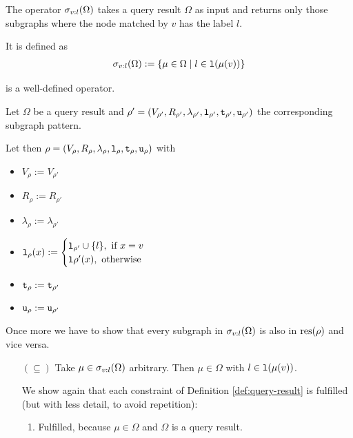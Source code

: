 \begin{definition}
\label{def:label-selection}

The  operator $\sigma_{v:l}(\Omega)$ takes a query
result $\Omega$ as input and returns only those subgraphs where the node
matched by $v$ has the label $l$.

It is defined as
\begin{align*}
  \sigma_{v:l}(\Omega) := \{ \mu \in \Omega \mid l \in \texttt{l}(\mu(v)) \}
\end{align*}

\begin{proofof}{ is a well-defined operator.}
\label{proof:label-selection-well-defined}

Let $\Omega$ be a query result and
$\rho' = (V_{\rho'}, R_{\rho'}, \lambda_{\rho'}, \texttt{l}_{\rho'}, \texttt{t}_{\rho'}, \texttt{u}_{\rho'})$
the corresponding subgraph pattern.

Let then $\rho = (V_\rho, R_\rho, \lambda_\rho, \texttt{l}_\rho, \texttt{t}_\rho, \texttt{u}_\rho)$
with
\begin{itemize}[label={}]
  \item $V_\rho := V_{\rho'}$
  \item $R_\rho := R_{\rho'}$
  \item $\lambda_\rho := \lambda_{\rho'}$
  \item $\texttt{l}_\rho(x) := \begin{cases}
                              \texttt{l}_{\rho'} \cup \{ l \}, \text{ if } x = v \\
                              \texttt{l}{\rho'}(x), \text{ otherwise}
                            \end{cases}$
  \item $\texttt{t}_\rho := \texttt{t}_{\rho'}$
  \item $\texttt{u}_\rho := \texttt{u}_{\rho'}$
\end{itemize}

Once more we have to show that every subgraph in
$\sigma_{v:l}(\Omega)$ is also in $\text{res}(\rho)$ and vice
versa.

\begin{itemize}
  \item[$(\subseteq)$]
    Take $\mu \in \sigma_{v:l}(\Omega)$ arbitrary.
    Then $\mu \in \Omega$ with $l \in \texttt{l}(\mu(v))$.
    
    We show again that each constraint of Definition \ref{def:query-result} is
    fulfilled (but with less detail, to avoid repetition):
    \begin{enumerate}[(1)]
      \item %
        Fulfilled, because $\mu \in \Omega$ and $\Omega$ is a query result.
        

\end{enumerate}
\end{itemize}
\end{proofof}
\end{definition}
